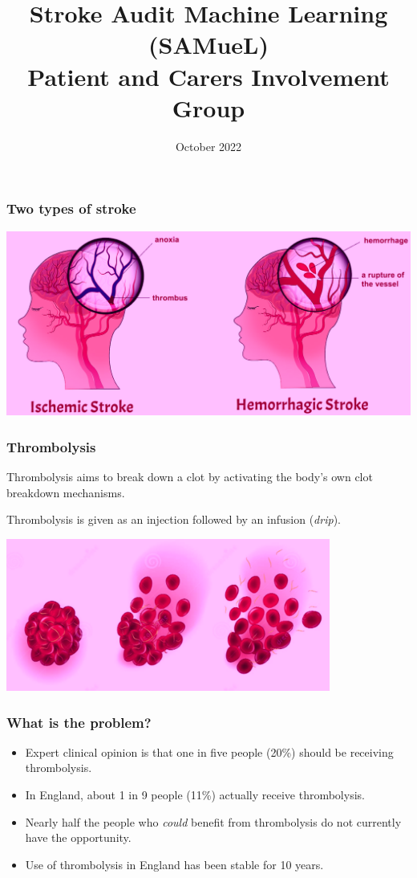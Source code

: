 \documentclass{beamer}
\title{Stroke Audit Machine Learning (SAMueL) \\ Patient and Carers Involvement Group}
\date{October 2022}
\begin{document}
\frame{\titlepage}



\begin{frame}
\frametitle{Two types of stroke}
\includegraphics[width=1.0\textwidth]{./images/stroke_types}
\end{frame}


\begin{frame}
\frametitle{Thrombolysis}
Thrombolysis aims to break down a clot by activating the body's own clot breakdown mechanisms.

\vspace{5mm}

Thrombolysis is given as an injection followed by an infusion (\emph{drip}).

\begin{center}
\includegraphics[width=0.8\textwidth]{./images/thrombolysis_mechanism}
\end{center}
\end{frame}


\begin{frame}
\frametitle{What is the problem?}
\begin{itemize}
    \setlength\itemsep{5mm}
    \item Expert clinical opinion is that one in five people (20\%) should be receiving thrombolysis.
    \item In England, about 1 in 9 people (11\%) actually receive thrombolysis.
    \item Nearly half the people who \emph{could} benefit from thrombolysis do not currently have the opportunity.
    \item Use of thrombolysis in England has been stable for 10 years.
\end{itemize}
\end{frame}
\end{document}
